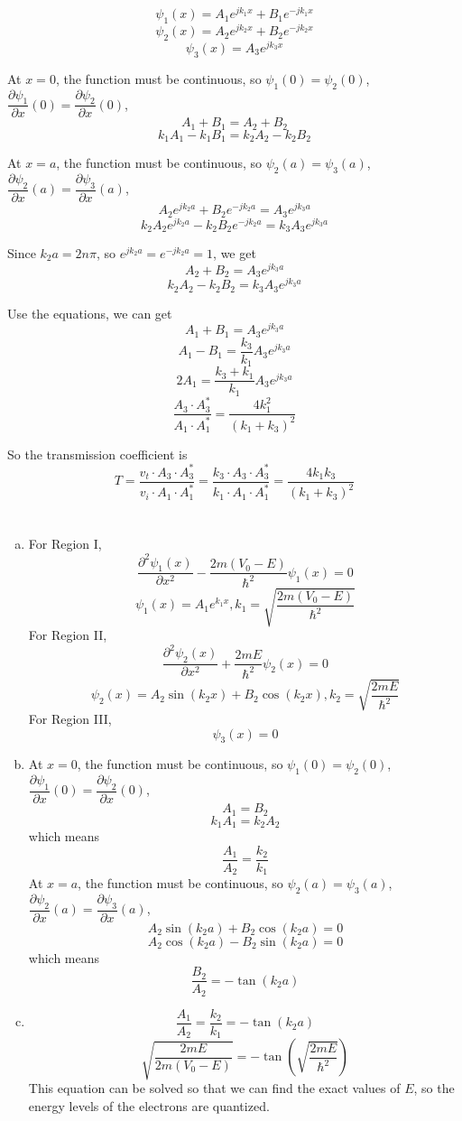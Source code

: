 \documentclass{article}
\begin{document}
\section{}
$$\psi_1(x)=A_1e^{jk_1x}+B_1e^{-jk_1x}$$
$$\psi_2(x)=A_2e^{jk_2x}+B_2e^{-jk_2x}$$
$$\psi_3(x)=A_3e^{jk_3x}$$

At $x=0$, the function must be continuous, so $\psi_1(0)=\psi_2(0)$, $\dfrac{\partial\psi_1}{\partial x}(0)=\dfrac{\partial\psi_2}{\partial x}(0)$,
$$A_1+B_1=A_2+B_2$$
$$k_1A_1-k_1B_1=k_2A_2-k_2B_2$$

At $x=a$, the function must be continuous, so $\psi_2(a)=\psi_3(a)$, $\dfrac{\partial\psi_2}{\partial x}(a)=\dfrac{\partial\psi_3}{\partial x}(a)$,
$$A_2e^{jk_2a}+B_2e^{-jk_2a}=A_3e^{jk_3a}$$
$$k_2A_2e^{jk_2a}-k_2B_2e^{-jk_2a}=k_3A_3e^{jk_3a}$$

Since $k_2a=2n\pi$, so $e^{jk_2a}=e^{-jk_2a}=1$, we get
$$A_2+B_2=A_3e^{jk_3a}$$
$$k_2A_2-k_2B_2=k_3A_3e^{jk_3a}$$

Use the equations, we can get
$$A_1+B_1=A_3e^{jk_3a}$$
$$A_1-B_1=\frac{k_3}{k_1}A_3e^{jk_3a}$$
$$2A_1=\frac{k_3+k_1}{k_1}A_3e^{jk_3a}$$
$$\frac{A_3\cdot A_3^*}{A_1\cdot A_1^*}=\frac{4k_1^2}{(k_1+k_3)^2}$$

So the transmission coefficient is
$$T=\frac{v_t\cdot A_3\cdot A_3^*}{v_i\cdot A_1\cdot A_1^*}=\frac{k_3\cdot A_3\cdot A_3^*}{k_1\cdot A_1\cdot A_1^*}=\frac{4k_1k_3}{(k_1+k_3)^2}$$

\section{}
\begin{enumerate}[(a)]
\item
For Region I,
$$\frac{\partial^2\psi_1(x)}{\partial x^2}-\frac{2m(V_0-E)}{\hbar^2}\psi_1(x)=0$$
$$\psi_1(x)=A_1e^{k_1x},k_1=\sqrt{\frac{2m(V_0-E)}{\hbar^2}}$$
For Region II,
$$\frac{\partial^2\psi_2(x)}{\partial x^2}+\frac{2mE}{\hbar^2}\psi_2(x)=0$$
$$\psi_2(x)=A_2\sin(k_2x)+B_2\cos(k_2x),k_2=\sqrt{\frac{2mE}{\hbar^2}}$$
For Region III,
$$\psi_3(x)=0$$
\item
At $x=0$, the function must be continuous, so $\psi_1(0)=\psi_2(0)$, $\dfrac{\partial\psi_1}{\partial x}(0)=\dfrac{\partial\psi_2}{\partial x}(0)$,
$$A_1=B_2$$
$$k_1A_1=k_2A_2$$
which means
$$\frac{A_1}{A_2}=\frac{k_2}{k_1}$$
At $x=a$, the function must be continuous, so $\psi_2(a)=\psi_3(a)$, $\dfrac{\partial\psi_2}{\partial x}(a)=\dfrac{\partial\psi_3}{\partial x}(a)$,
$$A_2\sin(k_2a)+B_2\cos(k_2a)=0$$
$$A_2\cos(k_2a)-B_2\sin(k_2a)=0$$
which means
$$\frac{B_2}{A_2}=-\tan(k_2a)$$
\item
$$\frac{A_1}{A_2}=\frac{k_2}{k_1}=-\tan(k_2a)$$
$$\sqrt{\frac{2mE}{2m(V_0-E)}}=-\tan\left(\sqrt{\frac{2mE}{\hbar^2}}\right)$$
This equation can be solved so that we can find the exact values of $E$, so the energy levels of the electrons are quantized.
\end{enumerate}
\end{document}
